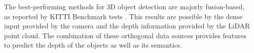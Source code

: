 \documentclass[10pt,twocolumn,letterpaper]{article}
\begin{document}

The best-performing methods for 3D object detection are majorly fusion-based, as reported by KITTI Benchmark tests \cite{KITTI2012}. This results are possible by the dense input provided by the camera and the depth information provided by the LiDAR point cloud. The combination of these orthogonal data sources provides features to predict the depth of the objects as well as its semantics.
\end{document}
